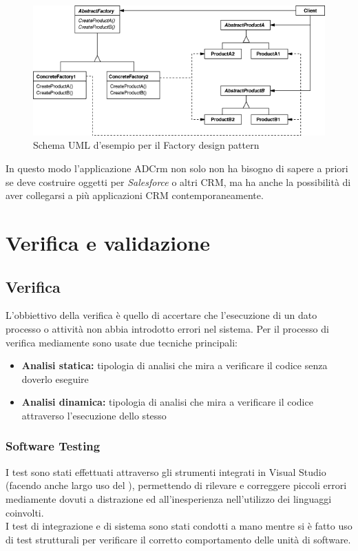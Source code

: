 \documentclass[12pt,a4paper,twoside,openany,english]{book}
\begin{document}
\begin{figure}[H]
	\centering
	\includegraphics[width=\linewidth]{images/abstract_factory_structure}
	\caption{Schema UML d'esempio per il Factory design pattern}
	\label{fig:abstractfactorystructure}
\end{figure}

In questo modo l'applicazione ADCrm non solo non ha bisogno di sapere a priori se deve costruire oggetti per \textit{Salesforce} o altri CRM, ma ha anche la possibilità di aver collegarsi a più applicazioni CRM contemporaneamente.





\chapter{Verifica e validazione}\label{verifica_validazione}
\section{Verifica}
L'obbiettivo della verifica è quello di accertare che l'esecuzione di un dato processo o attività non abbia introdotto errori nel sistema.
Per il processo di verifica mediamente sono usate due tecniche principali:
\begin{itemize}
	\item \textbf{Analisi statica:} tipologia di analisi che mira a verificare il codice senza doverlo eseguire
	\item \textbf{Analisi dinamica:} tipologia di analisi che mira a verificare il codice attraverso l'esecuzione dello stesso
\end{itemize}

\subsection{Software Testing}
I test sono stati effettuati attraverso gli strumenti integrati in Visual Studio (facendo anche largo uso del \textit{}), permettendo di rilevare e correggere piccoli errori mediamente dovuti a distrazione ed all'inesperienza nell'utilizzo dei linguaggi coinvolti.\\
I test di integrazione e di sistema sono stati condotti a mano mentre si è fatto uso di test strutturali per verificare il corretto comportamento delle unità di software.
\end{document}
